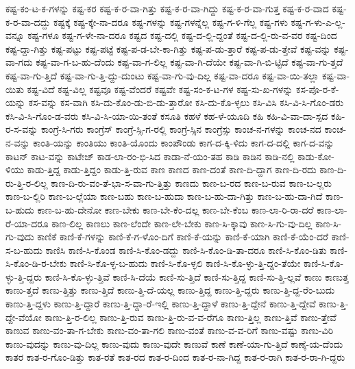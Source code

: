 {ಕಷ್ಟ-ಕಂ-ಟ-ಕ-ಗಳನ್ನು
ಕಷ್ಟ-ಕರ
ಕಷ್ಟ-ಕ-ರ-ವಾ-ಗಿತ್ತು
ಕಷ್ಟ-ಕ-ರ-ವಾ-ಗಿದ್ದು
ಕಷ್ಟ-ಕ-ರ-ವಾ-ಗುತ್ತ
ಕಷ್ಟ-ಕ-ರ-ವಾದ
ಕಷ್ಟ-ಕ-ರ-ವಾ-ದದ್ದು
ಕಷ್ಟಕ್ಕೆ
ಕಷ್ಟ-ಕ್ಕೇ-ನಾ-ದರೂ
ಕಷ್ಟ-ಗಳನ್ನು
ಕಷ್ಟ-ಗಳನ್ನೆಲ್ಲ
ಕಷ್ಟ-ಗ-ಳಿ-ಗೆಲ್ಲ
ಕಷ್ಟ-ಗಳು
ಕಷ್ಟ-ಗ-ಳು-ಎ-ಲ್ಲ-ವನ್ನೂ
ಕಷ್ಟ-ಗಳೂ
ಕಷ್ಟ-ಗ-ಳೇ-ನಾ-ದರೂ
ಕಷ್ಟದ
ಕಷ್ಟ-ದಲ್ಲಿ
ಕಷ್ಟ-ದ-ಲ್ಲಿ-ದ್ದಂತೆ
ಕಷ್ಟ-ದ-ಲ್ಲಿ-ರು-ವ-ವರ
ಕಷ್ಟ-ದಿಂದ
ಕಷ್ಟ-ದ್ದಾ-ಗಿತ್ತು
ಕಷ್ಟ-ಪಟ್ಟು
ಕಷ್ಟ-ಪಟ್ಟೆ
ಕಷ್ಟ-ಪ-ಡ-ಬೇ-ಕಾ-ಗಿತ್ತು
ಕಷ್ಟ-ಪ-ಡು-ತ್ತಾರೆ
ಕಷ್ಟ-ಪ-ಡು-ತ್ತೇವೆ
ಕಷ್ಟ-ವನ್ನು
ಕಷ್ಟ-ವಾ-ಗದು
ಕಷ್ಟ-ವಾ-ಗ-ಬ-ಹು-ದೆಂದು
ಕಷ್ಟ-ವಾ-ಗ-ಲಿಲ್ಲ
ಕಷ್ಟ-ವಾ-ಗಿ-ದೆಯೇ
ಕಷ್ಟ-ವಾ-ಗಿ-ಬಿ-ಟ್ಟಿದೆ
ಕಷ್ಟ-ವಾ-ಗು-ತ್ತದೆ
ಕಷ್ಟ-ವಾ-ಗು-ತ್ತಿದೆ
ಕಷ್ಟ-ವಾ-ಗು-ತ್ತಿ-ದ್ದು-ದುಂಟು
ಕಷ್ಟ-ವಾ-ಗು-ವು-ದಿಲ್ಲ
ಕಷ್ಟ-ವಾ-ದರೂ
ಕಷ್ಟ-ವಾ-ಯಿ-ತಲ್ಲಾ
ಕಷ್ಟ-ವಾ-ಯಿತು
ಕಷ್ಟ-ವಿದೆ
ಕಷ್ಟ-ವಿಲ್ಲ
ಕಷ್ಟವೂ
ಕಷ್ಟ-ವೆಂದರೆ
ಕಷ್ಟವೇ
ಕಷ್ಟ-ಸಂ-ಕ-ಟ-ಗಳ
ಕಷ್ಟ-ಸು-ಖ-ಗಳನ್ನು
ಕಸ-ಪೊ-ರ-ಕೆ-ಯನ್ನು
ಕಸ-ವನ್ನು
ಕಸ-ವಾಗಿ
ಕಸಿ-ದು-ಕೊಂ-ಡು-ಬಿ-ಡು-ತ್ತಾರೋ
ಕಸಿ-ದು-ಕೊ-ಳ್ಳಲು
ಕಸಿ-ವಿಸಿ
ಕಸಿ-ವಿ-ಸಿ-ಗೊಂ-ಡರು
ಕಸಿ-ವಿ-ಸಿ-ಗೊಂ-ಡ-ವರು
ಕಸಿ-ವಿ-ಸಿ-ಯಾ-ಯಿ-ತಂತೆ
ಕಸೂತಿ
ಕಹಳೆ
ಕಹ-ಳೆ-ಯೂದಿ
ಕಹಿ
ಕಹಿ-ವಿ-ವಾ-ದಾ-ಸ್ಪದ
ಕಹಿ-ರ-ಸ-ವನ್ನು
ಕಾಂಗ್ರೆ-ಸಿ-ಗರು
ಕಾಂಗ್ರೆಸ್
ಕಾಂಗ್ರೆ-ಸ್ಸಿ-ಗ-ರಲ್ಲಿ
ಕಾಂಗ್ರೆ-ಸ್ಸಿನ
ಕಾಂಗ್ರೆಸ್ಸು
ಕಾಂಚ-ನ-ಗಳನ್ನು
ಕಾಂಚ-ನದ
ಕಾಂಚ-ನ-ವನ್ನು
ಕಾಂತಿ-ಯನ್ನು
ಕಾಂತಿಯು
ಕಾಂತಿ-ಯೊಂದು
ಕಾಂಪೌಂಡು
ಕಾಗ-ದ-ಕ್ಕಿ-ಳಿದು
ಕಾಗ-ದ-ದಲ್ಲಿ
ಕಾಗ-ದ-ವನ್ನು
ಕಾಟನ್
ಕಾಟ-ವನ್ನು
ಕಾಟೇಜ್
ಕಾಡ-ಲಾ-ರಂ-ಭಿ-ಸಿದ
ಕಾಡಾ-ನೆ-ಯಂ-ತಹ
ಕಾಡಿ
ಕಾಡಿನ
ಕಾಡಿ-ನಲ್ಲಿ
ಕಾಡು-ಕೋ-ಳಿಯು
ಕಾಡು-ತ್ತಿದ್ದ
ಕಾಡು-ತ್ತಿದ್ದಂ
ಕಾಡು-ತ್ತಿ-ರುವ
ಕಾಣ
ಕಾಣದ
ಕಾಣ-ದಂತೆ
ಕಾಣ-ದಿ-ದ್ದಾಗ
ಕಾಣ-ದಿ-ರದು
ಕಾಣ-ದಿ-ರು-ತ್ತಿ-ರ-ಲಿಲ್ಲ
ಕಾಣ-ದಿ-ರು-ವಂ-ತೆ-ಭಾ-ಸ-ವಾ-ಗು-ತ್ತಿತ್ತು
ಕಾಣದು
ಕಾಣ-ಬ-ರದ
ಕಾಣ-ಬ-ರುವ
ಕಾಣ-ಬ-ಲ್ಲರು
ಕಾಣ-ಬ-ಲ್ಲಿರಿ
ಕಾಣ-ಬ-ಲ್ಲೆಯಾ
ಕಾಣ-ಬಹು
ಕಾಣ-ಬ-ಹುದಾ
ಕಾಣ-ಬ-ಹು-ದಾ-ಗಿತ್ತು
ಕಾಣ-ಬ-ಹು-ದಾ-ಗಿದೆ
ಕಾಣ-ಬ-ಹುದು
ಕಾಣ-ಬ-ಹು-ದೇನೋ
ಕಾಣ-ಬೇಕು
ಕಾಣ-ಬೇ-ಕೆಂ-ದಲ್ಲ
ಕಾಣ-ಬೇ-ಕೆಂಬ
ಕಾಣ-ಲಾ-ರಿ-ರಾ-ದರೆ
ಕಾಣ-ಲಾ-ರೆ-ಯಾ-ದರೂ
ಕಾಣ-ಲಿಲ್ಲ
ಕಾಣಲು
ಕಾಣ-ಲೆಂದೇ
ಕಾಣ-ಲೇ-ಬೇಕು
ಕಾಣ-ಸಿ-ಕ್ಕಾವು
ಕಾಣ-ಸಿ-ಗು-ವು-ದಿಲ್ಲ
ಕಾಣ-ಸಿ-ಗು-ವುದು
ಕಾಣಿಕೆ
ಕಾಣಿ-ಕೆ-ಗಳನ್ನು
ಕಾಣಿ-ಕೆ-ಗ-ಳೊಂ-ದಿಗೆ
ಕಾಣಿ-ಕೆ-ಯನ್ನು
ಕಾಣಿ-ಕೆ-ಯಾಗಿ
ಕಾಣಿ-ಕೆ-ಯೆಂ-ದರೆ
ಕಾಣಿ-ಸ-ಬ-ಹುದು
ಕಾಣಿಸಿ
ಕಾಣಿ-ಸಿ-ಕೊಂಡ
ಕಾಣಿ-ಸಿ-ಕೊಂ-ಡದ್ದು
ಕಾಣಿ-ಸಿ-ಕೊಂ-ಡಿ-ತಾ-ದರೂ
ಕಾಣಿ-ಸಿ-ಕೊಂ-ಡಿತು
ಕಾಣಿ-ಸಿ-ಕೊಂ-ಡಿ-ರ-ಬೇಕು
ಕಾಣಿ-ಸಿ-ಕೊ-ಳ್ಳ-ಬ-ಹುದು
ಕಾಣಿ-ಸಿ-ಕೊ-ಳ್ಳಲಿ
ಕಾಣಿ-ಸಿ-ಕೊ-ಳ್ಳು-ತ್ತಿ-ದ್ದಂ-ತೆಯೇ
ಕಾಣಿ-ಸಿ-ಕೊ-ಳ್ಳು-ತ್ತಿ-ದ್ದರು
ಕಾಣಿ-ಸಿ-ಕೊ-ಳ್ಳು-ತ್ತಿವೆ
ಕಾಣಿ-ಸಿ-ದೆಯೆ
ಕಾಣಿ-ಸು-ತ್ತಿದೆ
ಕಾಣಿ-ಸು-ತ್ತಿದ್ದ
ಕಾಣಿ-ಸು-ತ್ತಿ-ಲ್ಲವೆ
ಕಾಣು
ಕಾಣುತ್ತ
ಕಾಣು-ತ್ತದೆ
ಕಾಣು-ತ್ತಿತ್ತು
ಕಾಣು-ತ್ತಿದೆ
ಕಾಣು-ತ್ತಿ-ದೆ-ಯಲ್ಲ
ಕಾಣು-ತ್ತಿದ್ದ
ಕಾಣು-ತ್ತಿ-ದ್ದರು
ಕಾಣು-ತ್ತಿ-ದ್ದ-ರೆಂ-ಬುದು
ಕಾಣು-ತ್ತಿ-ದ್ದಳು
ಕಾಣು-ತ್ತಿ-ದ್ದಾರೆ
ಕಾಣು-ತ್ತಿ-ದ್ದಾ-ರೆ-ಇಲ್ಲಿ
ಕಾಣು-ತ್ತಿ-ದ್ದಾಳೆ
ಕಾಣು-ತ್ತಿ-ದ್ದೇನೆ
ಕಾಣು-ತ್ತಿ-ದ್ದೇವೆ
ಕಾಣು-ತ್ತಿ-ದ್ದೇ-ವೆಯೋ
ಕಾಣು-ತ್ತಿ-ರ-ಲಿಲ್ಲ
ಕಾಣು-ತ್ತಿ-ರುವ
ಕಾಣು-ತ್ತಿ-ರು-ವ-ವ-ರೆಗೂ
ಕಾಣು-ತ್ತಿಲ್ಲ
ಕಾಣು-ತ್ತಿವೆ
ಕಾಣು-ತ್ತೇವೆ
ಕಾಣುವ
ಕಾಣು-ವಂ-ತಾ-ಗ-ಬೇಕು
ಕಾಣು-ವಂ-ತಾ-ಗಲಿ
ಕಾಣು-ವಂತೆ
ಕಾಣು-ವ-ವ-ರಿಗೆ
ಕಾಣು-ವಷ್ಟು
ಕಾಣು-ವಿರಿ
ಕಾಣು-ವುದನ್ನು
ಕಾಣು-ವು-ದಿಲ್ಲ
ಕಾಣು-ವುದು
ಕಾಣು-ವುದೇ
ಕಾಣುವೆ
ಕಾಣೆ
ಕಾಣೆ-ಯಾ-ಗು-ತ್ತಿದೆ
ಕಾಣ್ಕೆ-ಯ-ದೆಂದು
ಕಾತರ
ಕಾತ-ರ-ಗೊಂ-ಡಿತ್ತು
ಕಾತ-ರತೆ
ಕಾತ-ರದ
ಕಾತ-ರ-ದಿಂದ
ಕಾತ-ರ-ನಾ-ಗಿದ್ದ
ಕಾತ-ರ-ರಾಗಿ
ಕಾತ-ರ-ರಾ-ಗಿ-ದ್ದರು
}
